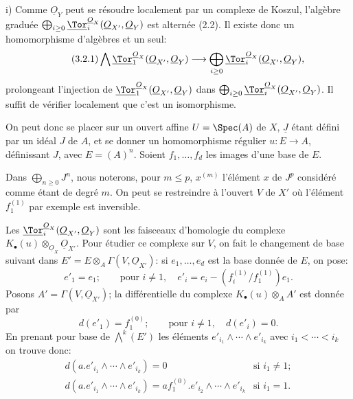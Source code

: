 
i)
Comme \(\underline{O}_Y\) peut se résoudre localement par un complexe de Koszul, l'algèbre graduée \(\bigoplus_{i\ge0}\underline{\Tor}_i^{\underline{O}_X}(\underline{O}_{X'},\underline{O}_Y)\) est alternée (2.2). Il existe donc un homomorphisme d'algèbres et un seul:
\begin{equation}\tag{3.2.1}
\bigwedge \underline{\Tor}_1^{\underline{O}_X}(\underline{O}_{X'},\underline{O}_Y)
\longrightarrow
\bigoplus_{i\ge0}\underline{\Tor}_i^{\underline{O}_X}(\underline{O}_{X'},\underline{O}_Y),
\end{equation}
prolongeant l'injection de \(\underline{\Tor}_1^{\underline{O}_X}(\underline{O}_{X'},\underline{O}_Y)\) dans
\(\bigoplus_{i\ge0}\underline{\Tor}_i^{\underline{O}_X}(\underline{O}_{X'},\underline{O}_Y)\). Il suffit de vérifier localement que c'est un isomorphisme.

On peut donc se placer sur un ouvert affine \(U=\Spec(A)\) de \(X\), \(\underline{J}\) étant défini par un idéal \(J\) de \(A\), et se donner un homomorphisme régulier \(u:E\to A\), définissant \(J\), avec \(E=(A)^n\). Soient \(f_1,\ldots,f_d\) les images d'une base de \(E\).

Dans \(\bigoplus_{n\ge0}J^n\), nous noterons, pour \(m\le p\), \(x^{(m)}\) l'élément \(x\) de \(J^p\) considéré comme étant de degré \(m\). On peut se restreindre à l'ouvert \(V\) de \(X'\) où l'élément \(f_1^{(1)}\) par exemple est inversible.

Les \(\underline{\Tor}_i^{\underline{O}_X}(\underline{O}_{X'},\underline{O}_Y)\) sont les faisceaux d'homologie du complexe \(K_\bullet(u)\otimes_{\underline{O}_X}\underline{O}_{X'}\). Pour étudier ce complexe sur \(V\), on fait le changement de base suivant dans \(E'=E\otimes_A\Gamma(V,\underline{O}_{X'})\): si \(e_1,\ldots,e_d\) est la base donnée de \(E\), on pose:
\[
e'_1=e_1;\qquad \text{pour }i\ne1,\quad
e'_i=e_i-(f_i^{(1)}/f_1^{(1)})e_1.
\]
Posons \(A'=\Gamma(V,\underline{O}_{X'})\); la différentielle du complexe \(K_\bullet(u)\otimes_A A'\) est donnée par
\[
d(e'_1)=f_1^{(0)};\qquad \text{pour }i\ne1,\quad d(e'_i)=0.
\]
En prenant pour base de \(\bigwedge^k(E')\) les éléments
\(e'_{i_1}\wedge\cdots\wedge e'_{i_k}\) avec \(i_1<\cdots<i_k\) on trouve donc:
\[
\begin{array}{ll}
d(a.e'_{i_1}\wedge\cdots\wedge e'_{i_k})=0
&\text{si }i_1\ne1;\\[3pt]
d(a.e'_{i_1}\wedge\cdots\wedge e'_{i_k})=
af_1^{(0)}.e'_{i_2}\wedge\cdots\wedge e'_{i_k}
&\text{si }i_1=1.
\end{array}
\]
